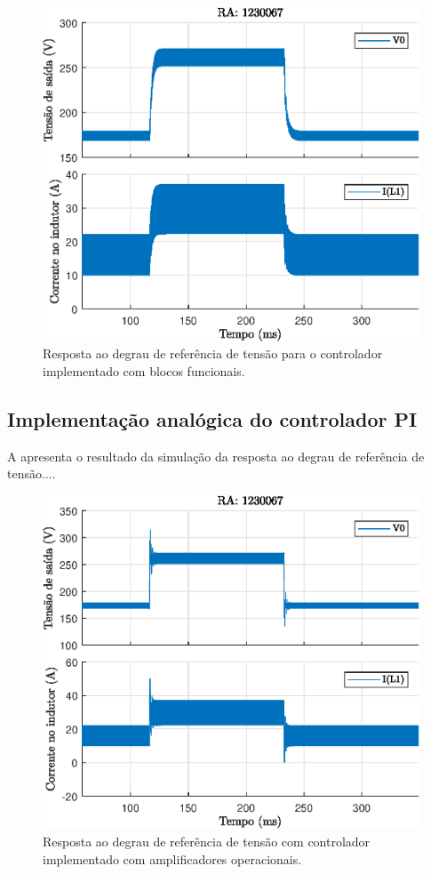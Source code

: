 \begin{figure}[!ht]
	\centering
	\includegraphics[width=0.9\linewidth]{Figs/Buck-Boost1malha}
	\caption{Resposta ao degrau de referência de tensão para o controlador implementado com blocos funcionais.}
	\label{fig:Buck-Boost1malha}
\end{figure}



\subsection{Implementação analógica do controlador PI}





A  apresenta o resultado da simulação da resposta ao degrau de referência de tensão....

\begin{figure}[!ht]
	\centering
	\includegraphics[width=0.9\linewidth]{Figs/Buck-Boost1malhaAmpOp}
	\caption{Resposta ao degrau de referência de tensão com controlador implementado com amplificadores operacionais.}
	\label{fig:Buck-Boost1malhaAmpOp}
\end{figure}




